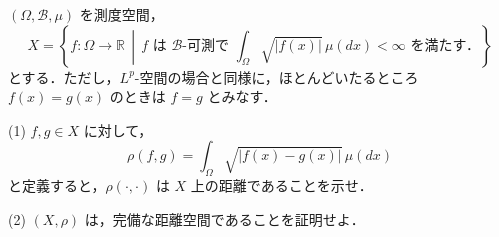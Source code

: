 \documentclass[12pt]{jlreq}
\newcommand{\R}{\mathbb{R}}
\begin{document}
\((\Omega, \mathcal{B}, \mu)\) を測度空間，
\[
  X = \left\{ f : \Omega \to \R \,\middle|\, f \text{ は } \mathcal{B}\text{-可測で } \int_\Omega \sqrt{|f(x)|} \, \mu(dx) < \infty \text{ を満たす．} \right\}
\]
とする．ただし，\(L^p\)-空間の場合と同様に，ほとんどいたるところ \(f(x) = g(x)\) のときは \(f = g\) とみなす．

(1) \(f, g \in X\) に対して，
  \[
    \rho(f,g) = \int_\Omega \sqrt{|f(x) - g(x)|} \, \mu(dx)
  \]
  と定義すると，\(\rho(\cdot,\cdot)\) は \(X\) 上の距離であることを示せ．

(2) \((X, \rho)\) は，完備な距離空間であることを証明せよ．
\end{document}
